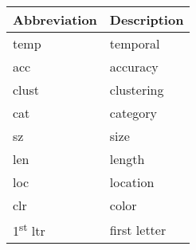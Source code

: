 \begin{tabular}{ll}
\toprule
             Abbreviation &  Description \\
\midrule
                     temp &     temporal \\
                      acc &     accuracy \\
                    clust &   clustering \\
                      cat &     category \\
                       sz &         size \\
                      len &       length \\
                      loc &     location \\
                      clr &        color \\
1\textsuperscript{st} ltr & first letter \\
\bottomrule
\end{tabular}

